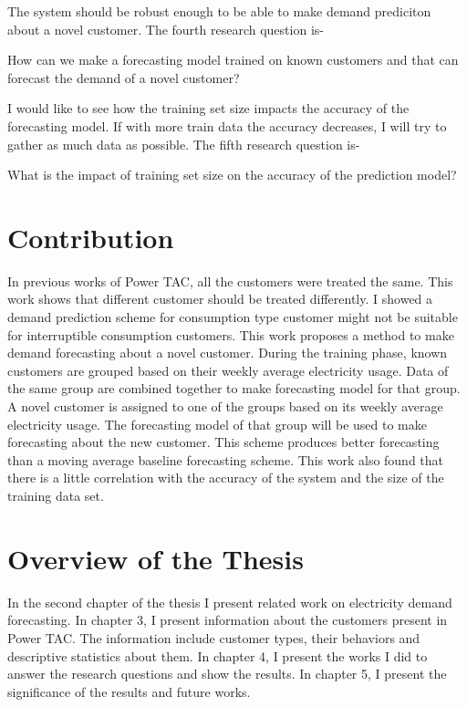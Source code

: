 The system should be robust enough to be able to make demand prediciton about a novel customer. The fourth research question is-
\begin{displayquote}
How can we make a forecasting model trained on known customers and that can forecast the demand of a novel customer?
\end{displayquote}

I would like to see how the training set size impacts the accuracy of the forecasting model. If with more train data the accuracy decreases, I will try to gather as much data as possible. The fifth research question is-
\begin{displayquote}
What is the impact of training set size on the accuracy of the prediction model?
\end{displayquote}
 
\section{Contribution}
In previous works of Power TAC, all the customers were treated the same. This work shows that different customer should be treated differently. I showed a demand prediction scheme for consumption type customer might not be suitable for interruptible consumption customers. This work proposes a method to make demand forecasting about a novel customer. During the training phase, known customers are grouped based on their weekly average electricity usage. Data of the same group are combined together to make forecasting model for that group. A novel customer is assigned to one of the groups based on its weekly average electricity usage. The forecasting model of that group will be used to make forecasting about the new customer. This scheme produces better forecasting than a moving average baseline forecasting scheme. This work also found that there is a little correlation with the accuracy of the system and the size of the training data set. 

\section{Overview of the Thesis}
In the second chapter of the thesis I present related work on electricity demand forecasting. In chapter 3, I present information about the customers present in Power TAC. The information include customer types, their behaviors and descriptive statistics about them. In chapter 4, I present the works I did to answer the research questions and show the results. In chapter 5, I present the significance of the results and future works.


